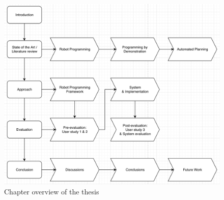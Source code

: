 %


\begin{figure}[h]
	\includegraphics[width=\linewidth]{figures/chapter-overview.png}
	\caption{Chapter overview of the thesis}
\end{figure}
